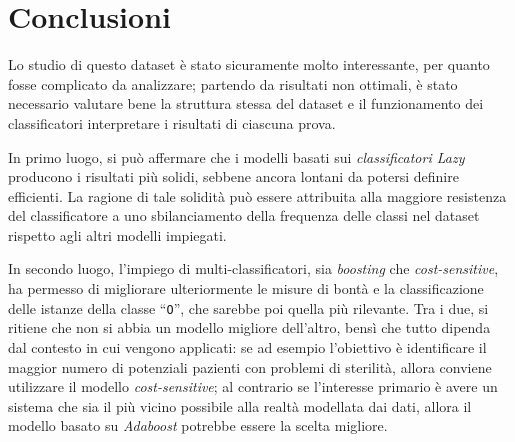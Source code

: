 \section{Conclusioni}

Lo studio di questo dataset è stato sicuramente molto interessante, per quanto fosse complicato da analizzare;
partendo da risultati non ottimali, è stato necessario valutare bene la struttura stessa del dataset e il funzionamento dei classificatori
interpretare i risultati di ciascuna prova.

In primo luogo, si può affermare che i modelli basati sui \emph{classificatori Lazy} producono i risultati più solidi, sebbene ancora lontani da potersi definire efficienti.
La ragione di tale solidità può essere attribuita alla maggiore resistenza del classificatore a uno sbilanciamento della frequenza delle classi nel dataset rispetto agli altri modelli impiegati.

In secondo luogo, l'impiego di multi-classificatori, sia \emph{boosting} che \emph{cost-sensitive},
ha permesso di migliorare ulteriormente le misure di bontà e la classificazione delle istanze della classe ``\texttt{O}'', che sarebbe poi quella più rilevante.
Tra i due, si ritiene che non si abbia un modello migliore dell'altro, bensì che tutto dipenda dal contesto in cui vengono applicati:
se ad esempio l'obiettivo è identificare il maggior numero di potenziali pazienti con problemi di sterilità, allora conviene utilizzare il modello \emph{cost-sensitive};
al contrario se l'interesse primario è avere un sistema che sia il più vicino possibile alla realtà modellata dai dati, allora il modello basato su \emph{Adaboost} potrebbe essere la scelta migliore.
